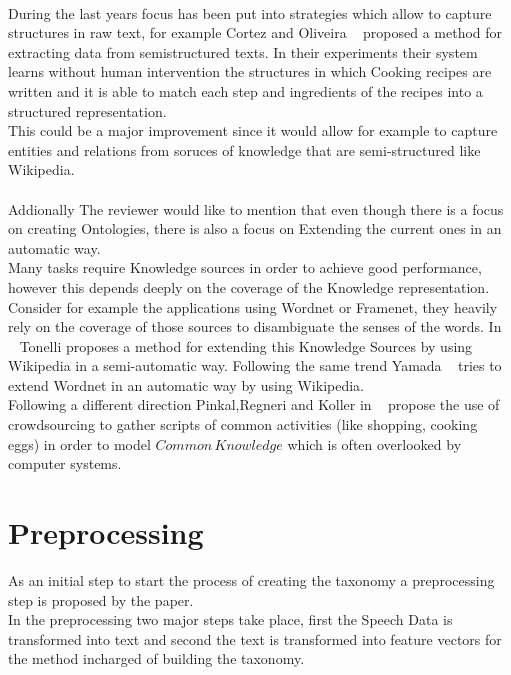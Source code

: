 \documentclass[4pt,a4paper]{article}
\begin{document}
\\
During the last years focus has been put into strategies which allow to capture structures in raw text, for example Cortez and Oliveira ~\cite{Cortez:2011:JUS:1989323.1989380} proposed a method for extracting data from semistructured texts. In their experiments their system learns without human intervention the structures in which Cooking recipes are written and it is able to match each step and ingredients of the recipes into a structured representation.\\
This could be a major improvement since it would allow for example to capture entities and relations from soruces of knowledge that are semi-structured like Wikipedia.\\
\\
Addionally The reviewer would like to mention that even though there is a focus on creating Ontologies, there is also a focus on Extending the current ones in an automatic way.\\
Many tasks require Knowledge sources in order to achieve good performance, however this depends deeply on the coverage of the Knowledge representation. 
Consider for example the applications using Wordnet or Framenet, they heavily rely on the coverage of those sources to disambiguate the senses of the words.
In ~\cite{Tonelli:2013:WWM:2405838.2405917} Tonelli proposes a method for extending this Knowledge Sources by using Wikipedia in a semi-automatic way.
Following the same trend Yamada ~\cite{yamada-EtAl:2011:IJCNLP-2011} tries to extend Wordnet in an automatic way by using Wikipedia.\\
Following a different direction Pinkal,Regneri and Koller  in ~\cite{regneri-koller-pinkal:2010:ACL} propose the use of crowdsourcing to gather scripts of common activities (like shopping, cooking eggs) in order to model $Common\, Knowledge$ which is often overlooked by computer systems.


\section{Preprocessing }
As an initial step to start the process of creating the taxonomy a preprocessing step is proposed by the paper.\\
In the preprocessing two major steps take place, first the Speech Data is transformed into text and second the text is transformed into feature vectors for the method incharged of building the taxonomy.
\end{document}
